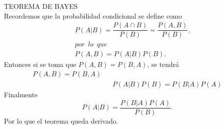 \documentclass{report}
\begin{document}
	TEOREMA DE BAYES\\
	
	Recordemos que la probabilidad condicional se define como
	\begin{eqnarray*}
		&& P(A|B)=\dfrac{P(A\cap B)}{P(B)}=\dfrac{P(A,B)}{P(B)},\\ && por\enspace lo\enspace que \\ && P(A,B)=P(A|B)P(B).
	\end{eqnarray*}
	Entonces si se toma que $ P(A,B)=P(B,A) $, se tendr\'a 
	\begin{eqnarray*}
	    P(A,B)=P(B,A)\\ && P(A|B)P(B)=P(B|A)P(A)
	\end{eqnarray*}
	Finalmente 
	\begin{equation*}
	    P(A|B)=\dfrac{P(B|A)P(A)}{P(B)}.
	\end{equation*}
	Por lo que el teorema queda derivado.
\end{document}

